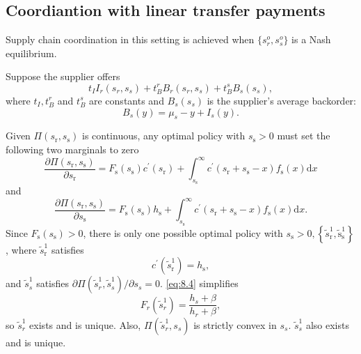\subsection{Coordiantion with linear transfer payments}
Supply chain coordination in this setting is achieved when $\{s_r^o,s_s^o\}$ is a Nash equilibrium. 

Suppose the supplier offers
\begin{equation*}
    t_I I_r(s_r,s_s)+t_B^r B_r(s_r,s_s)+t_B^s B_s(s_s),
\end{equation*}
where $t_I, t_B^r$ and $t_B^s$ are constants and $B_s(s_s)$ is the supplier's average backorder:
\begin{equation*}
    B_s(y)=\mu_s-y+I_s(y).
\end{equation*}

Given $\Pi\left(s_{\mathrm{r}}, s_{\mathrm{s}}\right)$ is continuous, any optimal policy with $s_{\mathrm{s}}>0$ must set the following two marginals to zero
\begin{equation}
    \frac{\partial \Pi\left(s_{\mathrm{r}}, s_{\mathrm{s}}\right)}{\partial s_{\mathrm{r}}}=F_{\mathrm{s}}\left(s_{\mathrm{s}}\right) c^{\prime}\left(s_{\mathrm{r}}\right)+\int_{s_{\mathrm{s}}}^{\infty} c^{\prime}\left(s_{\mathrm{r}}+s_{\mathrm{s}}-x\right) f_{\mathrm{s}}(x) \mathrm{d} x
\end{equation}
and
\begin{equation}
    \frac{\partial \Pi\left(s_{\mathrm{r}}, s_{\mathrm{s}}\right)}{\partial s_{\mathrm{s}}}=F_{\mathrm{s}}\left(s_{\mathrm{s}}\right) h_{\mathrm{s}}+\int_{s_{\mathrm{s}}}^{\infty} c^{\prime}\left(s_{\mathrm{r}}+s_{\mathrm{s}}-x\right) f_{\mathrm{s}}(x) \mathrm{d} x .
\end{equation}
Since $F_{\mathrm{s}}\left(s_{\mathrm{s}}\right)>0$, there is only one possible optimal policy with $s_{\mathrm{s}}>0,\left\{\tilde{s}_{\mathrm{r}}^{1}, \tilde{\mathrm{s}}_{\mathrm{s}}^{1}\right\}$, where $\tilde{s}_{\mathrm{r}}^{1}$ satisfies
\begin{equation}\label{eq:8.4}
    c^{\prime}\left(\tilde{s}_{\mathrm{r}}^{1}\right)=h_{\mathrm{s}},
\end{equation}
and $\tilde{s}_s^1$ satisfies $\partial\Pi(\tilde{s}_r^1,\tilde{s}_s^1)/\partial s_s=0$. \autoref{eq:8.4} simplifies 
\begin{equation*}
    F_r(\tilde{s}_r^1)=\frac{h_s+\beta}{h_r+\beta},
\end{equation*}
so $\tilde{s}_r^1$ exists and is unique. Also, $\Pi(\tilde{s}_r^1,s_s)$ is strictly convex in $s_s$. $\tilde{s}_s^1$ also exists and is unique.










